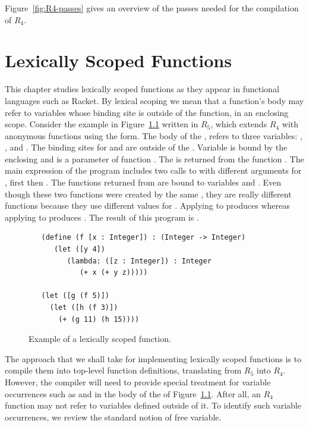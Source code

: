 \documentclass[11pt]{book}
\begin{document}
Figure~\ref{fig:R4-passes} gives an overview of the passes needed for
the compilation of $R_4$.


\chapter{Lexically Scoped Functions}
\label{ch:lambdas}

This chapter studies lexically scoped functions as they appear in
functional languages such as Racket. By lexical scoping we mean that a
function's body may refer to variables whose binding site is outside
of the function, in an enclosing scope.
%
Consider the example in Figure~\ref{fig:lexical-scoping} written in
$R_5$, which extends $R_4$ with anonymous functions using the
 form.  The body of the , refers to three
variables: , , and . The binding sites for
 and  are outside of the . Variable
 is bound by the enclosing  and  is a
parameter of function . The  is returned from the
function . The main expression of the program includes two
calls to  with different arguments for , first
 then . The functions returned from  are bound
to variables  and . Even though these two functions
were created by the same , they are really different
functions because they use different values for . Applying
 to  produces  whereas applying  to
 produces . The result of this program is .

\begin{figure}[btp]
\begin{lstlisting}
   (define (f [x : Integer]) : (Integer -> Integer)
      (let ([y 4])
         (lambda: ([z : Integer]) : Integer
            (+ x (+ y z)))))

   (let ([g (f 5)])
     (let ([h (f 3)])
       (+ (g 11) (h 15))))
\end{lstlisting}
\caption{Example of a lexically scoped function.}
\label{fig:lexical-scoping}
\end{figure}


The approach that we shall take for implementing lexically scoped
functions is to compile them into top-level function definitions,
translating from $R_5$ into $R_4$.  However, the compiler will need to
provide special treatment for variable occurrences such as 
and  in the body of the  of
Figure~\ref{fig:lexical-scoping}. After all, an $R_4$ function may not
refer to variables defined outside of it. To identify such variable
occurrences, we review the standard notion of free variable.
\end{document}
